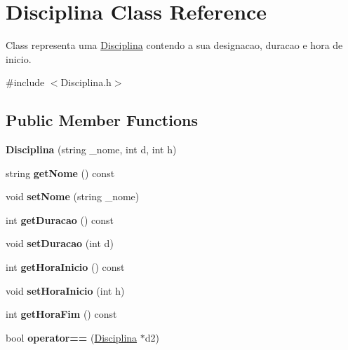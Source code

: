 \hypertarget{class_disciplina}{\section{Disciplina Class Reference}
\label{class_disciplina}
}


Class representa uma \hyperlink{class_disciplina}{Disciplina} contendo a sua designacao, duracao e hora de inicio.  




{\ttfamily \#include $<$Disciplina.\-h$>$}

\subsection*{Public Member Functions}
\begin{DoxyCompactItemize}
\item 
\hypertarget{class_disciplina_ae4496d51677842852775c89892387daf}{{\bfseries Disciplina} (string \-\_\-nome, int d, int h)}\label{class_disciplina_ae4496d51677842852775c89892387daf}

\item 
\hypertarget{class_disciplina_a09445908668708d2b62feb8b600a6af6}{string {\bfseries get\-Nome} () const }\label{class_disciplina_a09445908668708d2b62feb8b600a6af6}

\item 
\hypertarget{class_disciplina_a2d8e0957375f6d9f1f720a58acfb80de}{void {\bfseries set\-Nome} (string \-\_\-nome)}\label{class_disciplina_a2d8e0957375f6d9f1f720a58acfb80de}

\item 
\hypertarget{class_disciplina_aa3f19dc881279231e7eaa3194f01c4df}{int {\bfseries get\-Duracao} () const }\label{class_disciplina_aa3f19dc881279231e7eaa3194f01c4df}

\item 
\hypertarget{class_disciplina_aadc65f8c2f09352cc6f80881d67e720d}{void {\bfseries set\-Duracao} (int d)}\label{class_disciplina_aadc65f8c2f09352cc6f80881d67e720d}

\item 
\hypertarget{class_disciplina_afde765c64f78f530d09d404d15c4c5dd}{int {\bfseries get\-Hora\-Inicio} () const }\label{class_disciplina_afde765c64f78f530d09d404d15c4c5dd}

\item 
\hypertarget{class_disciplina_aa6822138c1277be2b2c5c420c1a1f34d}{void {\bfseries set\-Hora\-Inicio} (int h)}\label{class_disciplina_aa6822138c1277be2b2c5c420c1a1f34d}

\item 
\hypertarget{class_disciplina_a28b929f7e36d902da32b0ecc329420b6}{int {\bfseries get\-Hora\-Fim} () const }\label{class_disciplina_a28b929f7e36d902da32b0ecc329420b6}

\item 
\hypertarget{class_disciplina_a41f649eceb91b6e2cae441a5888c7b84}{bool {\bfseries operator==} (\hyperlink{class_disciplina}{Disciplina} $\ast$d2)}\label{class_disciplina_a41f649eceb91b6e2cae441a5888c7b84}

\end{DoxyCompactItemize}


